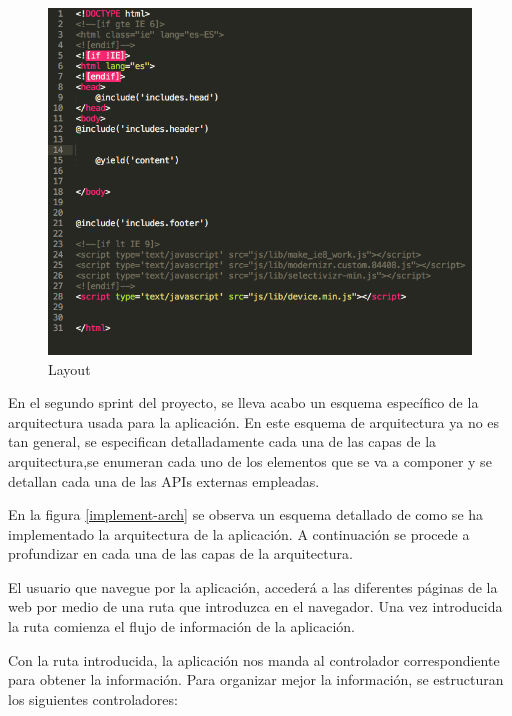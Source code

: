 \begin{figure}
\begin{center}
\includegraphics[width=1.0\textwidth]{imagenes/layout.png}
\caption{Layout}
\label{layout}
\end{center}
\end{figure}

En el segundo sprint del proyecto, se lleva acabo un esquema específico de la arquitectura usada para la aplicación. En este esquema de arquitectura ya no es tan general, se especifican detalladamente cada una de las capas de la arquitectura,se enumeran cada uno de los elementos que se va a componer y se detallan cada una de las APIs externas empleadas.

\vspace{5 mm}

En la figura \ref{implement-arch} se observa un esquema detallado de como se ha implementado la arquitectura de la aplicación. A continuación se procede a profundizar en cada una de las capas de la arquitectura.

\vspace{5 mm}

El usuario que navegue por la aplicación, accederá a las diferentes páginas de la web por medio de una ruta que introduzca en el navegador. Una vez introducida la ruta comienza el flujo de información de la aplicación.

\vspace{5 mm}

Con la ruta introducida, la aplicación nos manda al controlador correspondiente para obtener la información. Para organizar mejor la información, se estructuran los siguientes controladores:

